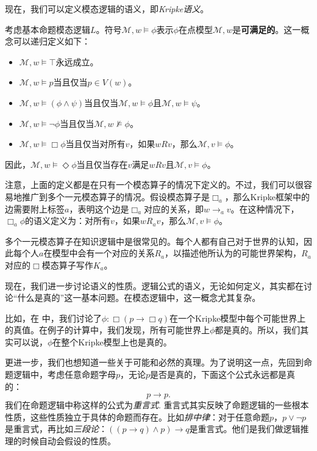 现在，我们可以定义模态逻辑的语义，即\emph{Kripke语义}。

\begin{definition}[Kripke语义]
考虑基本命题模态逻辑$L$。符号$\mathcal M,w\vDash\phi$表示$\phi$在点模型$\mathcal M,w$是\textbf{可满足的}。这一概念可以递归定义如下：
\begin{itemize}
\item $\mathcal M, w\vDash\top$永远成立。
\item $\mathcal M, w\vDash p$当且仅当$p\in V(w)$。
\item $\mathcal M, w\vDash (\phi\wedge\psi)$当且仅当$\mathcal M,w\vDash\phi$且$\mathcal M,w\vDash\psi$。
\item $\mathcal M, w\vDash \neg\phi$当且仅当$\mathcal M,w\not\vDash\phi$。
\item $\mathcal M, w\vDash \Box\phi$当且仅当对所有$v$，如果$wRv$，那么$\mathcal M,v\vDash\phi$。
\end{itemize}
因此，$\mathcal M, w\vDash \Diamond\phi$当且仅当存在$v$满足$wRv$且$\mathcal M,v\vDash\phi$。
\end{definition}

注意，上面的定义都是在只有一个模态算子的情况下定义的。不过，我们可以很容易地推广到多个一元模态算子的情况。假设模态算子是$\Box_a$，那么Kripke框架中的边需要附上标签$a$，表明这个边是$\Box_a$对应的关系，即$w\to_a v$。在这种情况下，$\Box_a\phi$的语义定义为：对所有$v$，如果$wR_av$，那么$\mathcal M,v\vDash\phi$。

多个一元模态算子在知识逻辑中是很常见的。每个人都有自己对于世界的认知，因此每个人$a$在模型中会有一个对应的关系$R_a$，以描述他所认为的可能世界架构，$R_a$对应的$\Box$模态算子写作$K_a$。

现在，我们进一步讨论语义的性质。逻辑公式的语义，无论如何定义，其实都在讨论“什么是真的”这一基本问题。在模态逻辑中，这一概念尤其复杂。

比如，在 中，我们讨论了$\phi:\Box (p\to\Box q)$在一个Kripke模型中每个可能世界上的真值。在例子的计算中，我们发现，所有可能世界上$\phi$都是真的。所以，我们其实可以说，$\phi$在整个Kripke模型上也是真的。

更进一步，我们也想知道一些关于可能和必然的真理。为了说明这一点，先回到命题逻辑中，考虑任意命题字母$p$，无论$p$是否是真的，下面这个公式永远都是真的：
\[p\to p.\]
我们在命题逻辑中称这样的公式为\emph{重言式}. 重言式其实反映了命题逻辑的一些根本性质，这些性质独立于具体的命题而存在。比如\emph{排中律}：对于任意命题$p$，$p\vee\neg p$是重言式，再比如\emph{三段论}：$((p\to q)\wedge p)\to q$是重言式。他们是我们做逻辑推理的时候自动会假设的性质。

